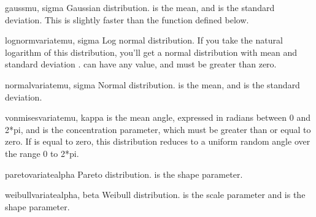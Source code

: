 \begin{funcdesc}{gauss}{mu, sigma}
Gaussian distribution.   is the mean, and  is the
standard deviation.  This is slightly faster than the
 function defined below.
\end{funcdesc}

\begin{funcdesc}{lognormvariate}{mu, sigma}
Log normal distribution.  If you take the natural logarithm of this
distribution, you'll get a normal distribution with mean  and
standard deviation .   can have any value, and 
must be greater than zero.  
\end{funcdesc}

\begin{funcdesc}{normalvariate}{mu, sigma}
Normal distribution.   is the mean, and  is the
standard deviation.
\end{funcdesc}

\begin{funcdesc}{vonmisesvariate}{mu, kappa}
 is the mean angle, expressed in radians between 0 and 2*pi,
and  is the concentration parameter, which must be greater
than or equal to zero.  If  is equal to zero, this
distribution reduces to a uniform random angle over the range 0 to
2*pi.
\end{funcdesc}

\begin{funcdesc}{paretovariate}{alpha}
Pareto distribution.   is the shape parameter.
\end{funcdesc}

\begin{funcdesc}{weibullvariate}{alpha, beta}
Weibull distribution.   is the scale parameter and
 is the shape parameter.
\end{funcdesc}

\begin{seealso}
\end{seealso}
